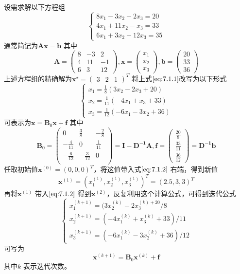 \documentclass[a4paper]{article}
\begin{document}
设需求解以下方程组
\[
\tag{7.1.1} \label{eq:7.1.1} 
\begin{cases}
	8 x_1 - 3x_2 + 2 x_3 = 20 \\
	4 x_1 + 11 x_2 - x_3 = 33 \\
	6 x_1 + 3 x_2 + 12 x_3 = 35
\end{cases} 
\] 
通常简记为$\mathbf{Ax} = \mathbf{b}$ 
其中
\[
\mathbf{A} = \begin{pmatrix} 
	8 & -3 & 2 \\
	4 & 11 & -1 \\
	6 & 3 & 12
\end{pmatrix},
\mathbf{x} = \begin{pmatrix} x_1 \\ x_2 \\ x_3 \end{pmatrix} ,
\mathbf{b} = \begin{pmatrix} 20 \\ 33 \\ 36 \end{pmatrix} 
\] 
上述方程组的精确解为$\mathbf{x}^{\star} = \begin{pmatrix} 3 & 2 & 1 \end{pmatrix}^{T} $
将上式$\ref{eq:7.1.1}$改写为以下形式
\[
\tag{7.1.2} \label{eq:7.1.2} 
\begin{cases}
	x_1 = \frac{1}{8} (3 x_2 - 2 x_3 + 20) \\
	x_2 = \frac{1}{11} (-4 x_1 + x_3 + 33) \\
	x_3 = \frac{1}{12} (-6 x_1 - 3 x_2 + 36)
\end{cases} 
\] 
可表示为$\mathbf{x} = \mathbf{B}_0 \mathbf{x} + \mathbf{f}$ 
其中 
\[
\mathbf{B}_0 = \begin{pmatrix} 
	0 & \frac{3}{8} & -\frac{2}{8} \\
	-\frac{4}{11} & 0 & \frac{1}{11} \\
	-\frac{6}{12} & -\frac{3}{12} & 0 \\
\end{pmatrix} = \mathbf{I} - \mathbf{D^{-1}A},
\mathbf{f} = \begin{pmatrix} \frac{20}{8} \\ \frac{33}{11} \\ \frac{36}{12} \end{pmatrix} = \mathbf{D^{-1}b}
\] 
任取初始值$\mathbf{x}^{(0)} = (0,0,0)^{T}$，将这值带入式$\ref{eq:7.1.2}$ 右端，得到新值
\[
\mathbf{x}^{(1)} = (x_1^{(1)}, x_2^{(1)}, x_3^{(1)})^{T} = (2.5, 3, 3)^{T}
\] 
再将$\mathbf{x}^{(1)}$ 带入$\ref{eq:7.1.2}$ 得到$\mathbf{x}^{(2)}$，反复利用这个计算公式，可得到迭代公式
\[
\tag{7.1.3} \label{eq:7.1.3} 
\begin{cases}
	x_1^{(k+1)} = (3 x_2^{(k)} - 2 x_3^{(k) + 20} / 8 \\
	x_2^{(k+1)} = (-4 x_1^{(k)} + x_3^{(k)} + 33) / 11 \\
	x_3^{(k+1)} = (-6 x_1^{(k)} - 3 x_2^{(k)} + 36) / 12
\end{cases} 
\] 
可写为
\[
\mathbf{x}^{(k+1)} = \mathbf{B}_0 \mathbf{x}^{(k)} + \mathbf{f} \tag{7.1.3} \label{eq:7.1.3} 
\] 
其中$k$ 表示迭代次数。
\end{document}

